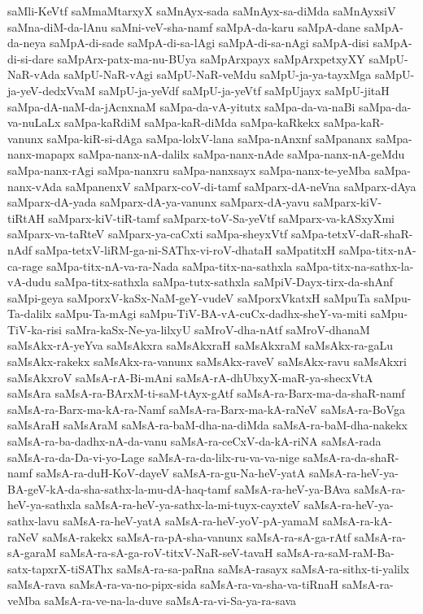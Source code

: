 {saMli-KeVtf
saMmaMtarxyX
saMnAyx-sada
saMnAyx-sa-diMda
saMnAyxsiV
saMna-diM-da-lAnu
saMni-veV-sha-namf
saMpA-da-karu
saMpA-dane
saMpA-da-neya
saMpA-di-sade
saMpA-di-sa-lAgi
saMpA-di-sa-nAgi
saMpA-disi
saMpA-di-si-dare
saMpArx-patx-ma-nu-BUya
saMpArxpayx
saMpArxpetxyXY
saMpU-NaR-vAda
saMpU-NaR-vAgi
saMpU-NaR-veMdu
saMpU-ja-ya-tayxMga
saMpU-ja-yeV-dedxVvaM
saMpU-ja-yeVdf
saMpU-ja-yeVtf
saMpUjayx
saMpU-jitaH
saMpa-dA-naM-da-jAcnxnaM
saMpa-da-vA-yitutx
saMpa-da-va-naBi
saMpa-da-va-nuLaLx
saMpa-kaRdiM
saMpa-kaR-diMda
saMpa-kaRkekx
saMpa-kaR-vanunx
saMpa-kiR-si-dAga
saMpa-lolxV-lana
saMpa-nAnxnf
saMpananx
saMpa-nanx-mapapx
saMpa-nanx-nA-dalilx
saMpa-nanx-nAde
saMpa-nanx-nA-geMdu
saMpa-nanx-rAgi
saMpa-nanxru
saMpa-nanxsayx
saMpa-nanx-te-yeMba
saMpa-nanx-vAda
saMpanenxV
saMparx-coV-di-tamf
saMparx-dA-neVna
saMparx-dAya
saMparx-dA-yada
saMparx-dA-ya-vanunx
saMparx-dA-yavu
saMparx-kiV-tiRtAH
saMparx-kiV-tiR-tamf
saMparx-toV-Sa-yeVtf
saMparx-va-kASxyXmi
saMparx-va-taRteV
saMparx-ya-caCxti
saMpa-sheyxVtf
saMpa-tetxV-daR-shaR-nAdf
saMpa-tetxV-liRM-ga-ni-SAThx-vi-roV-dhataH
saMpatitxH
saMpa-titx-nA-ca-rage
saMpa-titx-nA-va-ra-Nada
saMpa-titx-na-sathxla
saMpa-titx-na-sathx-la-vA-dudu
saMpa-titx-sathxla
saMpa-tutx-sathxla
saMpiV-Dayx-tirx-da-shAnf
saMpi-geya
saMporxV-kaSx-NaM-geY-vudeV
saMporxVkatxH
saMpuTa
saMpu-Ta-dalilx
saMpu-Ta-mAgi
saMpu-TiV-BA-vA-cuCx-dadhx-sheY-va-miti
saMpu-TiV-ka-risi
saMra-kaSx-Ne-ya-lilxyU
saMroV-dha-nAtf
saMroV-dhanaM
saMsAkx-rA-yeYva
saMsAkxra
saMsAkxraH
saMsAkxraM
saMsAkx-ra-gaLu
saMsAkx-rakekx
saMsAkx-ra-vanunx
saMsAkx-raveV
saMsAkx-ravu
saMsAkxri
saMsAkxroV
saMsA-rA-Bi-mAni
saMsA-rA-dhUbxyX-maR-ya-shecxVtA
saMsAra
saMsA-ra-BArxM-ti-saM-tAyx-gAtf
saMsA-ra-Barx-ma-da-shaR-namf
saMsA-ra-Barx-ma-kA-ra-Namf
saMsA-ra-Barx-ma-kA-raNeV
saMsA-ra-BoVga
saMsAraH
saMsAraM
saMsA-ra-baM-dha-na-diMda
saMsA-ra-baM-dha-nakekx
saMsA-ra-ba-dadhx-nA-da-vanu
saMsA-ra-ceCxV-da-kA-riNA
saMsA-rada
saMsA-ra-da-Da-vi-yo-Lage
saMsA-ra-da-lilx-ru-va-va-nige
saMsA-ra-da-shaR-namf
saMsA-ra-duH-KoV-dayeV
saMsA-ra-gu-Na-heV-yatA
saMsA-ra-heV-ya-BA-geV-kA-da-sha-sathx-la-mu-dA-haq-tamf
saMsA-ra-heV-ya-BAva
saMsA-ra-heV-ya-sathxla
saMsA-ra-heV-ya-sathx-la-mi-tuyx-cayxteV
saMsA-ra-heV-ya-sathx-lavu
saMsA-ra-heV-yatA
saMsA-ra-heV-yoV-pA-yamaM
saMsA-ra-kA-raNeV
saMsA-rakekx
saMsA-ra-pA-sha-vanunx
saMsA-ra-sA-ga-rAtf
saMsA-ra-sA-garaM
saMsA-ra-sA-ga-roV-titxV-NaR-seV-tavaH
saMsA-ra-saM-raM-Ba-satx-tapxrX-tiSAThx
saMsA-ra-sa-paRna
saMsA-rasayx
saMsA-ra-sithx-ti-yalilx
saMsA-rava
saMsA-ra-va-no-pipx-sida
saMsA-ra-va-sha-va-tiRnaH
saMsA-ra-veMba
saMsA-ra-ve-na-la-duve
saMsA-ra-vi-Sa-ya-ra-sava
}
